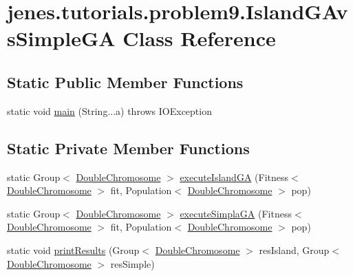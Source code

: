 \hypertarget{classjenes_1_1tutorials_1_1problem9_1_1_island_g_avs_simple_g_a}{\section{jenes.\-tutorials.\-problem9.\-Island\-G\-Avs\-Simple\-G\-A Class Reference}
\label{classjenes_1_1tutorials_1_1problem9_1_1_island_g_avs_simple_g_a}
}
\subsection*{Static Public Member Functions}
\begin{DoxyCompactItemize}
\item 
static void \hyperlink{classjenes_1_1tutorials_1_1problem9_1_1_island_g_avs_simple_g_a_a20124a96736560ad40f38c5cf057c8df}{main} (String...\-a)  throws I\-O\-Exception 
\end{DoxyCompactItemize}
\subsection*{Static Private Member Functions}
\begin{DoxyCompactItemize}
\item 
static Group$<$ \hyperlink{classjenes_1_1chromosome_1_1_double_chromosome}{Double\-Chromosome} $>$ \hyperlink{classjenes_1_1tutorials_1_1problem9_1_1_island_g_avs_simple_g_a_a593d4a6805e5a71e1eb3b30f24e3088c}{execute\-Island\-G\-A} (Fitness$<$ \hyperlink{classjenes_1_1chromosome_1_1_double_chromosome}{Double\-Chromosome} $>$ fit, Population$<$ \hyperlink{classjenes_1_1chromosome_1_1_double_chromosome}{Double\-Chromosome} $>$ pop)
\item 
static Group$<$ \hyperlink{classjenes_1_1chromosome_1_1_double_chromosome}{Double\-Chromosome} $>$ \hyperlink{classjenes_1_1tutorials_1_1problem9_1_1_island_g_avs_simple_g_a_a8fbbd68f88740cfef8e3578409c7b28c}{execute\-Simpla\-G\-A} (Fitness$<$ \hyperlink{classjenes_1_1chromosome_1_1_double_chromosome}{Double\-Chromosome} $>$ fit, Population$<$ \hyperlink{classjenes_1_1chromosome_1_1_double_chromosome}{Double\-Chromosome} $>$ pop)
\item 
static void \hyperlink{classjenes_1_1tutorials_1_1problem9_1_1_island_g_avs_simple_g_a_a97bc52a775806a663525a22d51009976}{print\-Results} (Group$<$ \hyperlink{classjenes_1_1chromosome_1_1_double_chromosome}{Double\-Chromosome} $>$ res\-Island, Group$<$ \hyperlink{classjenes_1_1chromosome_1_1_double_chromosome}{Double\-Chromosome} $>$ res\-Simple)
\end{DoxyCompactItemize}
